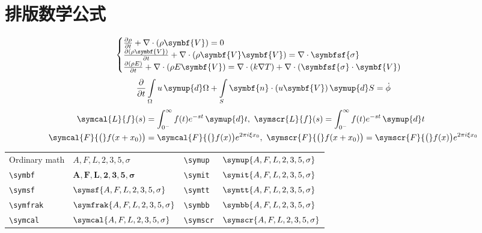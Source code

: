 \documentclass[master]{shtthesis}
\begin{document}
\section{排版数学公式}
\providecommand{\Vector}[1]{\ensuremath{\symbf{ #1 }}}
\providecommand{\Tensor}[1]{\ensuremath{\symbfsf{ #1 }}}
\begin{equation}
  \begin{cases}
      \frac{\partial \rho}{\partial t} + \nabla\cdot(\rho\Vector{V}) = 0 \\
      \frac{\partial (\rho\Vector{V})}{\partial t} + \nabla\cdot(\rho\Vector{V}\Vector{V}) = \nabla\cdot\Tensor{\sigma} \\
      \frac{\partial (\rho E)}{\partial t} + \nabla\cdot(\rho E\Vector{V}) = \nabla\cdot(k\nabla T) + \nabla\cdot(\Tensor{\sigma}\cdot\Vector{V})
  \end{cases}
\end{equation}
\begin{equation}
  \frac{\partial }{\partial t}\int\limits_{\Omega} u \, \symup{d}\Omega + \int\limits_{S} \Vector{n}\cdot(u\Vector{V}) \, \symup{d}S = \dot{\phi}
\end{equation}
\begin{equation*}
  \begin{split}
      \symcal{L} \{f\}(s) &= \int _{0^{-}}^{\infty} f(t) e^{-st} \, \symup{d}t, \ 
      \symscr{L} \{f\}(s) = \int _{0^{-}}^{\infty} f(t) e^{-st} \, \symup{d}t\\
      \symcal{F} {\bigl (} f(x+x_{0}) {\bigr )} &= \symcal{F} {\bigl (} f(x) {\bigr )} e^{2\pi i\xi x_{0}}, \ 
      \symscr{F} {\bigl (} f(x+x_{0}) {\bigr )} = \symscr{F} {\bigl (} f(x) {\bigr )} e^{2\pi i\xi x_{0}}
  \end{split}
\end{equation*}

\begin{center}
\begin{tabular}{*{4}{l}}
  \toprule
  Ordinary math& $A,F,L,2,3,5,\sigma$& \verb|\symup|& $\symup{A,F,L,2,3,5,\sigma}$ \\
  \verb|\symbf|& $\symbf{A,F,L,2,3,5,\sigma}$& \verb|\symit|& $\symit{A,F,L,2,3,5,\sigma}$ \\
  \verb|\symsf|& $\symsf{A,F,L,2,3,5,\sigma}$& \verb|\symtt|& $\symtt{A,F,L,2,3,5,\sigma}$ \\
  \verb|\symfrak|& $\symfrak{A,F,L,2,3,5,\sigma}$& \verb|\symbb|& $\symbb{A,F,L,2,3,5,\sigma}$ \\
  \verb|\symcal|& $\symcal{A,F,L,2,3,5,\sigma}$& \verb|\symscr|& $\symscr{A,F,L,2,3,5,\sigma}$ \\
  \bottomrule
\end{tabular}
\end{center}
\end{document}
